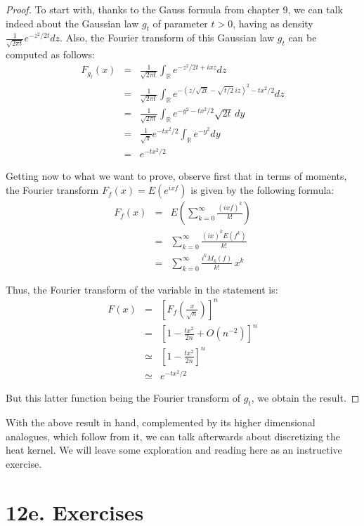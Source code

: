 \documentclass[12pt]{amsbook}
\begin{document}
\begin{proof}
To start with, thanks to the Gauss formula from chapter 9, we can talk indeed about the Gaussian law $g_t$ of parameter $t>0$, having as density $\frac{1}{\sqrt{2\pi t}}e^{-z^2/2t}dz$. Also, the Fourier transform of this Gaussian law $g_t$ can be computed as follows:
\begin{eqnarray*}
F_{g_t}(x)
&=&\frac{1}{\sqrt{2\pi t}}\int_\mathbb Re^{-z^2/2t+ixz}dz\\
&=&\frac{1}{\sqrt{2\pi t}}\int_\mathbb Re^{-(z/\sqrt{2t}-\sqrt{t/2}\,iz)^2-tx^2/2}dz\\
&=&\frac{1}{\sqrt{2\pi t}}\int_\mathbb Re^{-y^2-tx^2/2}\sqrt{2t}\,dy\\
&=&\frac{1}{\sqrt{\pi}}e^{-tx^2/2}\int_\mathbb Re^{-y^2}dy\\
&=&e^{-tx^2/2}
\end{eqnarray*}

Getting now to what we want to prove, observe first that in terms of moments, the Fourier transform $F_f(x)=E(e^{ixf})$ is given by the following formula:
\begin{eqnarray*}
F_f(x)
&=&E\left(\sum_{k=0}^\infty\frac{(ixf)^k}{k!}\right)\\
&=&\sum_{k=0}^\infty\frac{(ix)^kE(f^k)}{k!}\\
&=&\sum_{k=0}^\infty\frac{i^kM_k(f)}{k!}\,x^k
\end{eqnarray*}

Thus, the Fourier transform of the variable in the statement is:
\begin{eqnarray*}
F(x)
&=&\left[F_f\left(\frac{x}{\sqrt{n}}\right)\right]^n\\
&=&\left[1-\frac{tx^2}{2n}+O(n^{-2})\right]^n\\
&\simeq&\left[1-\frac{tx^2}{2n}\right]^n\\
&\simeq&e^{-tx^2/2}
\end{eqnarray*}

But this latter function being the Fourier transform of $g_t$, we obtain the result.
\end{proof}

With the above result in hand, complemented by its higher dimensional analogues, which follow from it, we can talk afterwards about discretizing the heat kernel. We will leave some exploration and reading here as an instructive exercise.

\section*{12e. Exercises}
\end{document}
